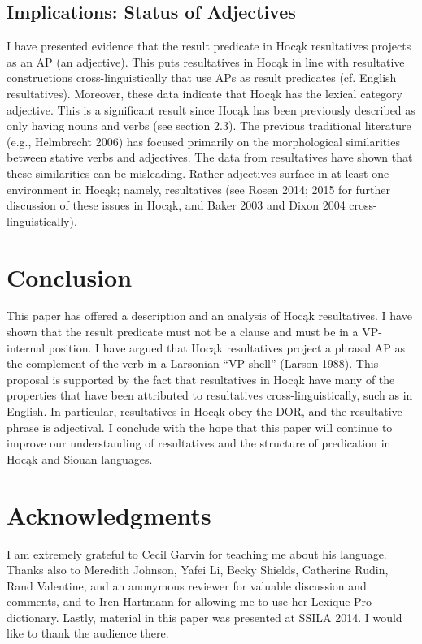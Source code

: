 \documentclass[output=paper]{LSP/langsci}
\begin{document}
\subsection{Implications: Status of Adjectives}

I have presented evidence that the result predicate in Hoc\k{a}k resultatives projects as an AP (an adjective). This puts resultatives in Hoc\k{a}k in line with resultative constructions cross-linguistically that use APs as result predicates (cf. English resultatives). Moreover, these data indicate that Hoc\k{a}k has the lexical category adjective. This is a significant result since Hoc\k{a}k has been previously described as only having nouns and verbs (see section 2.3). The previous traditional literature (e.g., Helmbrecht 2006) has focused primarily on the morphological similarities between stative verbs and adjectives. The data from resultatives have shown that these similarities can be misleading. Rather adjectives surface in at least one environment in Hoc\k{a}k; namely, resultatives (see Rosen 2014; 2015 for further discussion of these issues in Hoc\k{a}k, and Baker 2003 and Dixon 2004 cross-linguistically).

\section{Conclusion}
This paper has offered a description and an analysis of Hoc\k{a}k resultatives. I have shown that the result predicate must not be a clause and must be in a VP-internal position. I have argued that Hoc\k{a}k resultatives project a phrasal AP as the complement of the verb in a Larsonian ``VP shell'' (Larson 1988). This proposal is supported by the fact that resultatives in Hoc\k{a}k have many of the properties that have been attributed to resultatives cross-linguistically, such as in English. In particular, resultatives in Hoc\k{a}k obey the DOR, and the resultative phrase is adjectival. I conclude with the hope that this paper will continue to improve our understanding of resultatives and the structure of predication in Hoc\k{a}k and Siouan languages.

\section* {Acknowledgments}
I am extremely grateful to Cecil Garvin for teaching me about his language. Thanks also to Meredith Johnson, Yafei Li, Becky Shields, Catherine Rudin, Rand Valentine, and an anonymous reviewer for valuable discussion and comments, and to Iren Hartmann for allowing me to use her Lexique Pro dictionary. Lastly, material in this paper was presented at SSILA 2014. I would like to thank the audience there.
\end{document}
